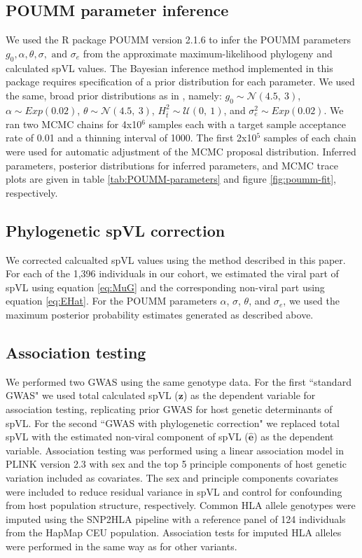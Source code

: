 \documentclass[]{article}
\begin{document}
\begin{doublespace}
\subsection{POUMM parameter inference}

We used the R package POUMM version 2.1.6 \parencite{Mitov2017a-POUMM} to infer the POUMM parameters $g_0, \alpha, \theta, \sigma, \text{ and }\sigma_e$ from the approximate maximum-likelihood phylogeny and calculated spVL values. The Bayesian inference method implemented in this package requires specification of a prior distribution for each parameter. We used the same, broad prior distributions as in \citet{Mitov2018}, namely: $g_{0} \sim \mathcal{N}(4.5,\ 3)$, $\alpha \sim Exp(0.02)$, $\theta \sim \mathcal{N}(4.5,\ 3)$, $H^2_{\bar{t}} \sim \mathcal{U}(0,\ 1)$, and $\sigma^2_e \sim Exp(0.02)$. We ran two MCMC chains for 4x10$^6$ samples each with a target sample acceptance rate of 0.01 and a thinning interval of 1000. The first 2x10$^5$ samples of each chain were used for automatic adjustment of the MCMC proposal distribution. Inferred parameters, posterior distributions for inferred parameters, and MCMC trace plots are given in table \ref{tab:POUMM-parameters} and figure \ref{fig:poumm-fit}, respectively.

\subsection{Phylogenetic spVL correction}
We corrected calcualted spVL values using the method described in this paper. For each of the 1,396 individuals in our cohort, we estimated the viral part of spVL using equation \ref{eq:MuG} and the corresponding non-viral part using equation \ref{eq:EHat}. For the POUMM parameters $\alpha$, $\sigma$, $\theta$, and $\sigma_e$, we used the maximum posterior probability estimates generated as described above. 

\subsection{Association testing}
We performed two GWAS using the same genotype data. For the first ``standard GWAS" we used total calculated spVL ($\bm{z}$) as the dependent variable for association testing, replicating prior GWAS for host genetic determinants of spVL. For the second ``GWAS with phylogenetic correction" we replaced total spVL with the estimated non-viral component of spVL ($\hat{\bm{e}}$) as the dependent variable. Association testing was performed using a linear association model in PLINK version 2.3 \parencite{Chang2015} with sex and the top 5 principle components of host genetic variation included as covariates. The sex and principle components covariates were included to reduce residual variance in spVL and control for confounding from host population structure, respectively. Common HLA allele genotypes were imputed using the SNP2HLA pipeline \parencite{Jia2013a} with a reference panel of 124 individuals from the HapMap CEU population. Association tests for imputed HLA alleles were performed in the same way as for other variants. 


\end{doublespace}
\end{document}
